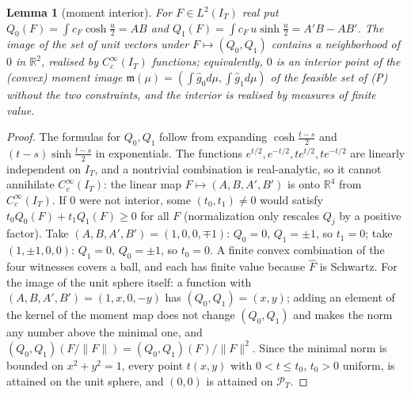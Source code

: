 \documentclass[11pt]{amsart}
\newtheorem{lemma}[theorem]{Lemma}
\theoremstyle{definition}
\theoremstyle{remark}
\newcommand{\R}{\mathbb R}
\newcommand{\PT}{\mathcal P_T}
\newcommand{\IT}{I_T}
\newcommand{\gh}[1]{\widehat g_{#1}}
\newcommand{\Fh}{\widehat F}
\newcommand{\cF}{c_F}
\begin{document}
\begin{lemma}[moment interior]\label{lem:W}
For $F\in L^2(\IT)$ real put $Q_0(F)=\int\cF\cosh\frac u2=A B$ and
$Q_1(F)=\int\cF\,u\sinh\frac u2=A'B-AB'$. The image of the set of unit vectors under
$F\mapsto(Q_0,Q_1)$ contains a neighborhood of $0$ in $\R^2$, realised by $C_c^\infty(\IT)$
functions; equivalently, $0$ is an interior point of the (convex) moment image
$\mathfrak m(\mu)=(\int\gh0d\mu,\int\gh1d\mu)$ of the feasible set of (P) without the two
constraints, and the interior is realised by measures of finite value.
\end{lemma}
\begin{proof}
The formulas for $Q_0,Q_1$ follow from expanding $\cosh\frac{t-s}2$ and $(t-s)\sinh\frac{t-s}2$
in exponentials. The functions $e^{t/2},e^{-t/2},te^{t/2},te^{-t/2}$ are linearly independent
on $\IT$, and a nontrivial combination is real-analytic, so it cannot annihilate
$C_c^\infty(\IT)$: the linear map $F\mapsto(A,B,A',B')$ is onto $\R^4$ from $C_c^\infty(\IT)$.
If $0$ were not interior, some $(t_0,t_1)\ne0$ would satisfy $t_0Q_0(F)+t_1Q_1(F)\ge0$ for all
$F$ (normalization only rescales $Q_j$ by a positive factor). Take $(A,B,A',B')=(1,0,0,\mp1)$:
$Q_0=0$, $Q_1=\pm1$, so $t_1=0$; take $(1,\pm1,0,0)$: $Q_1=0$, $Q_0=\pm1$, so $t_0=0$. A finite
convex combination of the four witnesses covers a ball, and each has finite value because
$\Fh$ is Schwartz. For the image of the unit sphere itself: a function with
$(A,B,A',B')=(1,x,0,-y)$ has $(Q_0,Q_1)=(x,y)$; adding an element of the kernel of the moment map
does not change $(Q_0,Q_1)$ and makes the norm any number above the minimal one, and
$(Q_0,Q_1)(F/\|F\|)=(Q_0,Q_1)(F)/\|F\|^2$. Since the minimal norm is bounded on $x^2+y^2=1$, every
point $t(x,y)$ with $0<t\le t_0$, $t_0>0$ uniform, is attained on the unit sphere, and $(0,0)$ is
attained on $\PT$.
\end{proof}
\end{document}

